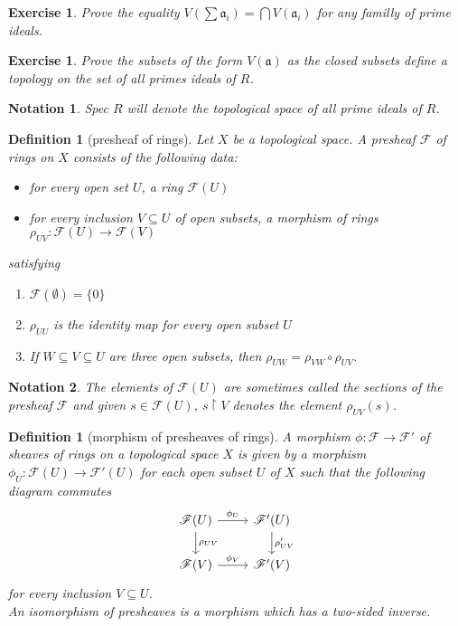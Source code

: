 \documentclass[12pt]{article}
\newtheorem{definition}[proposition]{Definition}
\newtheorem{ex}[proposition]{Exercise}
\newtheorem{notation}{Notation}
\begin{document}
\begin{ex}
	Prove the equality $V(\sum \mathfrak{a}_i) = \bigcap V(\mathfrak{a}_i)$ for any familly of prime ideals.
\end{ex}

\begin{ex}
	Prove the subsets of the form $V(\mathfrak{a})$ as the closed subsets define a topology on the set of all primes ideals of $R$. 
\end{ex}

\begin{notation}
	Spec $R$ will denote the topological space of all prime ideals of $R$.
\end{notation}

\begin{definition}[presheaf of rings]
	Let $X$ be a topological space. A presheaf $\mathscr{F}$ of rings on $X$ consists of the following data:
	\begin{itemize}
		\item for every open set $U$, a ring $\mathscr{F}(U)$
		\item for every inclusion $V \subseteq U$ of open subsets, a morphism of rings $\rho_{UV}: \mathscr{F}(U) \rightarrow \mathscr{F}(V)$  
	\end{itemize}
satisfying 
	\begin{enumerate}
		\item $\mathscr{F}(\emptyset) = \lbrace 0 \rbrace$
		\item $\rho_{UU}$ is the identity map for every open subset $U$
		\item  If $W \subseteq V \subseteq U$ are three open subsets, then $\rho_{UW} = \rho_{VW} \circ \rho_{UV}$.
	\end{enumerate}
\end{definition}

\begin{notation}
	The elements of $\mathscr{F}(U)$ are sometimes called the sections of the presheaf $\mathscr{F}$ and given $s \in \mathscr{F}(U)$, $s\restriction V$ denotes the element $\rho_{UV}(s)$.
\end{notation}

\begin{definition}[morphism of presheaves of rings]
	A morphism $\phi: \mathscr{F} \rightarrow \mathscr{F}'$ of sheaves of rings on a topological space $X$ is given by a morphism $\phi_U: \mathscr{F}(U) \rightarrow \mathscr{F}'(U)$ for each open subset $U$ of $X$ such that  the following diagram commutes
	\[
	\begin{tikzcd}
	\mathscr{F}(U) \arrow[r, "\phi_U"] \arrow[d, "\rho_{UV}"] & \mathscr{F}'(U) \arrow[d, "\rho'_{UV}"] \\
	\mathscr{F}(V) \arrow[r, "\phi_V"] & \mathscr{F}'(V) 
	\end{tikzcd}
	\]
	for every inclusion $V \subseteq U$. \\
	An isomorphism of presheaves is a morphism which has a two-sided inverse.
\end{definition}		
\end{document}
